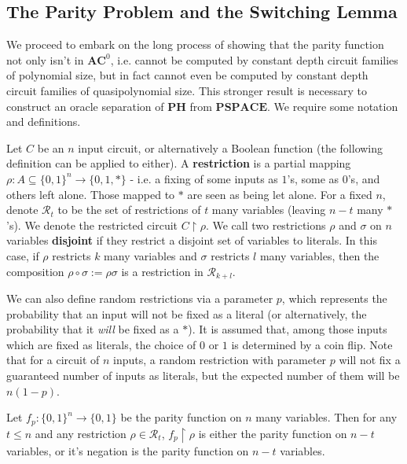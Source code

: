 \subsection{The Parity Problem and the Switching Lemma}
We proceed to embark on the long process of showing that the parity function not only isn't in $\bm{AC}^0$, i.e. cannot be computed by constant depth circuit families of polynomial size, but in fact cannot even be computed by constant depth circuit families of quasipolynomial size. This stronger result is necessary to construct an oracle separation of $\bm{PH}$ from $\bm{PSPACE}$. We require some notation and definitions.
\begin{definition}
	Let $C$ be an $n$ input circuit, or alternatively a Boolean function (the following definition can be applied to either). A \textbf{restriction} is a partial mapping $\rho: A \subseteq \{0,1\}^n \to \{0,1,*\}$ - i.e. a fixing of some inputs as $1$'s, some as $0$'s, and others left alone. Those mapped to $*$ are seen as being let alone. For a fixed $n$, denote $\mathcal{R}_t$ to be the set of restrictions of $t$ many variables (leaving $n-t$ many $*$'s). We denote the restricted circuit $C \restriction \rho$. We call two restrictions $\rho$ and $\sigma$ on $n$ variables \textbf{disjoint} if they restrict a disjoint set of variables to literals. In this case, if $\rho$ restricts $k$ many variables and $\sigma$ restricts $l$ many variables, then the composition $\rho \circ \sigma := \rho\sigma$ is a restriction in $\mathcal{R}_{k+l}$. \par 
	We can also define random restrictions via a parameter $p$, which represents the probability that an input will not be fixed as a literal (or alternatively, the probability that it \emph{will} be fixed as a $*$). It is assumed that, among those inputs which are fixed as literals, the choice of $0$ or $1$ is determined by a coin flip. Note that for a circuit of $n$ inputs, a random restriction with parameter $p$ will not fix a guaranteed number of inputs as literals, but the expected number of them will be $n(1-p)$. 
\end{definition}
\begin{fact}
	Let $f_p:\{0,1\}^n \to \{0,1\}$ be the parity function on $n$ many variables. Then for any $t \leq n$ and any restriction $\rho \in \mathcal{R}_t$, $f_p \restriction \rho$ is either the parity function on $n-t$ variables, or it's negation is the parity function on $n-t$ variables. 
\end{fact}
